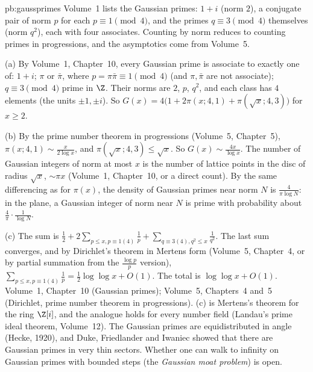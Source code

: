 \begin{solution}{pb:gaussprimes}
\idea Volume~1 lists the Gaussian primes: $1+i$ (norm $2$), a conjugate pair of norm $p$ for each $p\equiv1\pmod4$, and the
primes $q\equiv3\pmod4$ themselves (norm $q^2$), each with four associates. Counting by norm reduces to counting primes in
progressions, and the asymptotics come from Volume~5.

\writeup (a) By Volume~1, Chapter~10, every Gaussian prime is associate to exactly one of: $1+i$; $\pi$ or $\bar\pi$, where
$p=\pi\bar\pi\equiv1\pmod4$ (and $\pi,\bar\pi$ are not associate); $q\equiv3\pmod4$ prime in $\Z$. Their norms are $2$, $p$, $q^2$, and
each class has $4$ elements (the units $\pm1,\pm i$). So $G(x)=4\bigl(1+2\pi(x;4,1)+\pi(\sqrt x;4,3)\bigr)$ for $x\ge2$.

(b) By the prime number theorem in progressions (Volume~5, Chapter~5), $\pi(x;4,1)\sim\frac x{2\log x}$, and
$\pi(\sqrt x;4,3)\le\sqrt x$. So $G(x)\sim\frac{4x}{\log x}$. The number of Gaussian integers of norm at most $x$ is the number of lattice
points in the disc of radius $\sqrt x$, $\sim\pi x$ (Volume~1, Chapter~10, or a direct count). By the same differencing as for
$\pi(x)$, the density of Gaussian primes near norm $N$ is $\frac4{\pi\log N}$: in the plane, a Gaussian integer of norm near $N$
is prime with probability about $\frac{4}{\pi}\cdot\frac1{\log N}$.

(c) The sum is $\frac12+2\sum_{p\le x,p\equiv1(4)}\frac1p+\sum_{q\equiv3(4),q^2\le x}\frac1{q^2}$. The last sum converges, and by
Dirichlet's theorem in Mertens form (Volume~5, Chapter~4, or by partial summation from the
$\frac{\log p}p$ version), $\sum_{p\le x,p\equiv1(4)}\frac1p=\frac12\log\log x+O(1)$. The total is $\log\log x+O(1)$.
\tools Volume~1, Chapter~10 (Gaussian primes); Volume~5, Chapters~4 and~5 (Dirichlet, prime number theorem in progressions).
\leads (c) is Mertens's theorem for the ring $\Z[i]$, and the analogue holds for every number field (Landau's prime ideal
theorem, Volume~12). The Gaussian primes are equidistributed in angle (Hecke, 1920), and Duke, Friedlander and Iwaniec showed that
there are Gaussian primes in very thin sectors. Whether one can walk to infinity on Gaussian primes with bounded steps (the
\emph{Gaussian moat problem}) is open.
\end{solution}

